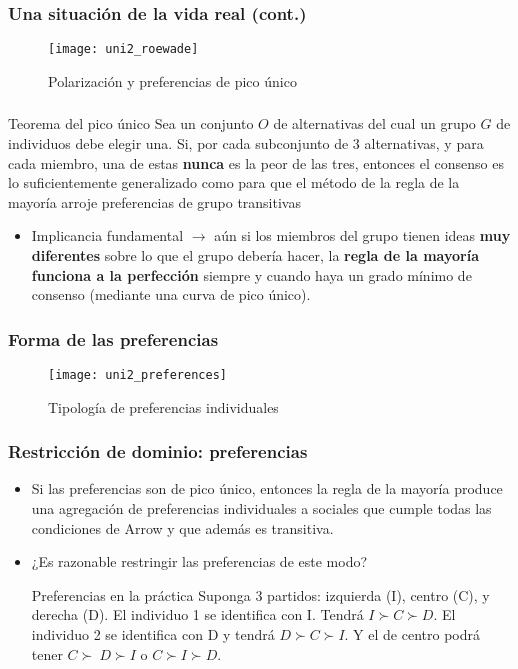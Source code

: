 \documentclass[14pt,aspectratio=169]{beamer}
\begin{document}
\begin{frame}\frametitle{Una situación de la vida real (cont.)}
  \begin{figure}[htbp] \vspace{-0.25cm}
    \centering
    \texttt{[image: uni2\_roewade]}
    \caption{Polarización y preferencias de pico único}
    \label{fig:1}
  \end{figure}
\end{frame}

\begin{frame}\frametitle{}
\begin{block}{Teorema del pico único}
Sea un conjunto $O$ de alternativas del cual un grupo $G$ de
individuos debe elegir una. Si, por cada subconjunto de 3
alternativas, y para cada miembro, una de estas \textbf{nunca} es la peor de las tres, entonces el
consenso es lo suficientemente generalizado como para que el método de
la regla de la mayoría arroje preferencias de grupo transitivas
\end{block}
\begin{itemize}\itemsep 10pt
\item Implicancia fundamental $\longrightarrow$ aún si los
  miembros del grupo tienen ideas \textbf{muy diferentes}
  sobre lo que el grupo debería hacer, la \textbf{regla de la mayoría funciona
  a la perfección} siempre y cuando haya un grado mínimo de
  consenso (mediante una curva de pico único).
\end{itemize}
\end{frame}


\begin{frame}\frametitle{Forma de las preferencias}
  \begin{figure}[htbp]
    \centering
    \texttt{[image: uni2\_preferences]}
    \caption{Tipología de preferencias individuales}
    \label{fig:1}
  \end{figure}
\end{frame}

\begin{frame}\frametitle{Restricción de dominio: preferencias}
\begin{itemize}\itemsep 10pt
\item Si las preferencias son de pico único,
  entonces la regla de la mayoría produce una agregación de
  preferencias individuales a sociales que cumple todas las
  condiciones de Arrow y que además es transitiva.
\item ¿Es razonable restringir las preferencias de este
  modo?
\begin{block}{Preferencias en la práctica}
Suponga 3 partidos: izquierda (I), centro (C), y derecha
(D). El individuo 1 se identifica con I. Tendrá $I \succ C
\succ D$. El individuo 2 se identifica con D y tendrá $D \succ C \succ I$. Y el de centro podrá tener $C \succ
\ D \succ I$ o $C \succ I \succ D$.
\end{block}
\end{itemize}
\end{frame}
\end{document}
